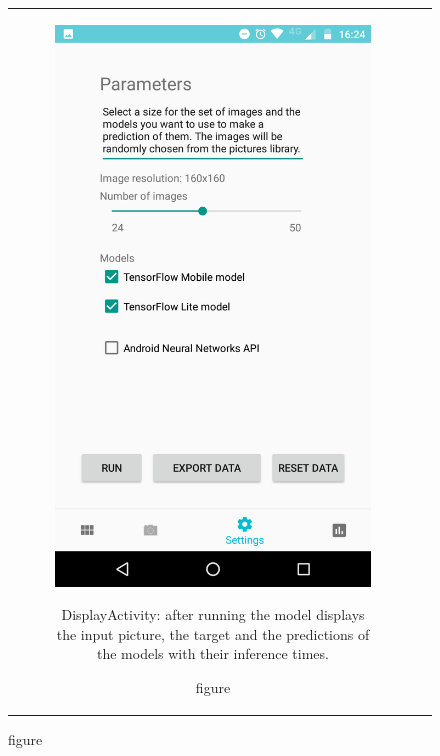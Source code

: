 \documentclass{article}
\begin{document}
\begin{figure}[!h]
\begin{tabular}[c]{cc}
    \begin{subfigure}[c]{0.4\textwidth}
      \includegraphics[width=\textwidth]{img/app/settings.png}
      \caption{figure}{\footnotesize DisplayActivity: after running the model displays the input picture, the target and the predictions of the models with their inference times.}
      \label{fig:DisplayActivity}
    \end{subfigure}\\


\end{tabular}
\end{figure}
\end{document}
